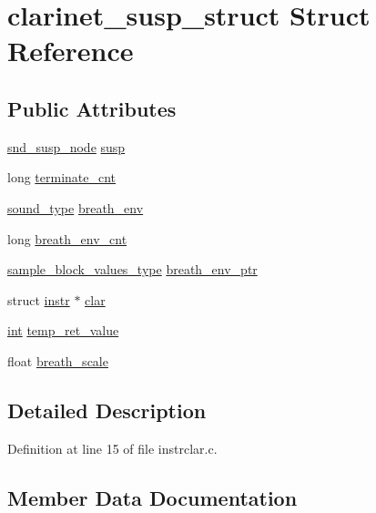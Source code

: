 \hypertarget{structclarinet__susp__struct}{}\section{clarinet\+\_\+susp\+\_\+struct Struct Reference}
\label{structclarinet__susp__struct}
\subsection*{Public Attributes}
\begin{DoxyCompactItemize}
\item 
\hyperlink{sound_8h_a6b268203688a934bd798ceb55f85d4c0}{snd\+\_\+susp\+\_\+node} \hyperlink{structclarinet__susp__struct_a31cef06e4ffcf1e2ac862095d71f9ff8}{susp}
\item 
long \hyperlink{structclarinet__susp__struct_a1db922d73ab5a3fc1b3f6059ac023b86}{terminate\+\_\+cnt}
\item 
\hyperlink{sound_8h_a792cec4ed9d6d636d342d9365ba265ea}{sound\+\_\+type} \hyperlink{structclarinet__susp__struct_a2a7b7482b0801e24c4eefb516dfc13e3}{breath\+\_\+env}
\item 
long \hyperlink{structclarinet__susp__struct_a3c282cc51a24245e252d2d0084236d23}{breath\+\_\+env\+\_\+cnt}
\item 
\hyperlink{sound_8h_a83d17f7b465d1591f27cd28fc5eb8a03}{sample\+\_\+block\+\_\+values\+\_\+type} \hyperlink{structclarinet__susp__struct_a414a7069e5dff0967d888793c49a9a0f}{breath\+\_\+env\+\_\+ptr}
\item 
struct \hyperlink{structinstr}{instr} $\ast$ \hyperlink{structclarinet__susp__struct_a5bdb4ef924ebde455c055b51e562fd63}{clar}
\item 
\hyperlink{xmltok_8h_a5a0d4a5641ce434f1d23533f2b2e6653}{int} \hyperlink{structclarinet__susp__struct_a5bcaf90a2ff9baa50b8ad2814f6c70ae}{temp\+\_\+ret\+\_\+value}
\item 
float \hyperlink{structclarinet__susp__struct_a431fd9f1de0f0b4bccca55d81be6d4a1}{breath\+\_\+scale}
\end{DoxyCompactItemize}


\subsection{Detailed Description}


Definition at line 15 of file instrclar.\+c.



\subsection{Member Data Documentation}
